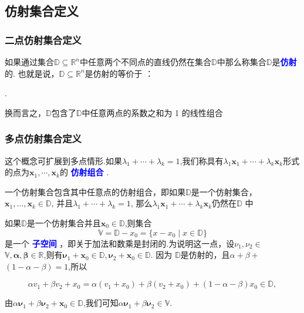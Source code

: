 \documentclass{lzureport}
\begin{document}
\subsection{仿射集合定义}
\subsubsection{二点仿射集合定义}
如果通过集合$\mathbb{D}\subseteq\mathbb{R}^n$中任意两个不同点的直线仍然在集合$\mathbb{D}$中那么称集合$\mathbb{D}$是\textcolor{blue}{\textbf{仿射}}的. 
也就是说，$\mathbb{D}\subseteq\mathbb{R}^n$是仿射的\textcolor{YBXPurple}{等价于} ： 

\begin{center}
	\colorbox{yellow}{}.
\end{center}

换而言之，$\mathbb{D}$包含了$\mathbb{D}$中任意两点的系数之和为 1 的线性组合

\subsubsection{多点仿射集合定义}
这个概念可扩展到多点情形.如果$\lambda_1+\cdots+\lambda_k=1$,我们称具有$\lambda_1\boldsymbol{x}_1+\cdots+\lambda_k\boldsymbol{x}_k$形式的点为$\boldsymbol x_1,\cdots,\boldsymbol x_k$的 \textcolor{blue}{\textbf{仿射组合}} . 

一个仿射集合包含其中任意点的仿射组合，即如果$\mathbb{D}$是一个仿射集合，
$\boldsymbol{x}_1, \ldots , \boldsymbol{x}_k\in \mathbb{D} $, 
并且$\lambda_1+\cdots+\lambda_k=1$,
那么$\lambda_1\boldsymbol{x}_1+\cdots+\lambda_k\boldsymbol{x}_k$仍然在$\mathbb{D}$ 中

如果$\mathbb{D}$是一个仿射集合并且$\boldsymbol x_0\in\mathbb{D}$,则集合
$$\mathbb{V}=\mathbb{D}-x_0=\{x-x_0\mid x\in\mathbb{D}\}$$
是一个 \textcolor{blue}{\textbf{子空间}} ，即关于加法和数乘是封闭的.为说明这一点，设$\nu_1,\nu_2\in$ $\mathbb{V},\boldsymbol{\alpha},\boldsymbol{\beta}\in\mathbb{R}$,则有$\boldsymbol{\nu }_1+ \boldsymbol{x}_0\in \mathbb{D} , \boldsymbol{\nu }_2+ \boldsymbol{x}_0\in \mathbb{D}$.
因为 $\mathbb{D}$是仿射的，且$\alpha+\beta+$ $(1-\alpha-\beta)=1$,所以

$$\alpha v_1+\beta v_2+x_0=\alpha\left(v_1+x_0\right)+\beta\left(v_2+x_0\right)+\left(1-\alpha-\beta\right)x_0\in\mathbb{D},$$

由$\alpha\boldsymbol{\nu}_1+\beta\boldsymbol{\nu}_2+\boldsymbol{x}_0\in\mathbb{D}$,我们可知$\alpha\boldsymbol{\nu}_1+\beta\boldsymbol{\nu}_2\in\mathbb{V}.$
\end{document}
